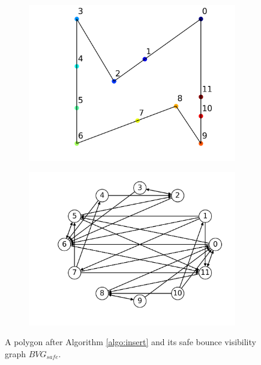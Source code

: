 \documentclass[]{article}
\begin{document}
\begin{figure}
\centering
\begin{subfigure}{0.5\textwidth}
\centering
\includegraphics[width=\linewidth]{figures/simple_bit_inserted.png}
\end{subfigure}%
\begin{subfigure}{0.5\textwidth}
\centering
\includegraphics[width=\linewidth]{figures/simple_bit_safe_graph.png}
\end{subfigure}
\caption{A polygon after Algorithm \ref{algo:insert} and its safe bounce
visibility graph $BVG_{safe}$. }
\label{fig:simple_bit}
\end{figure}
\end{document}
